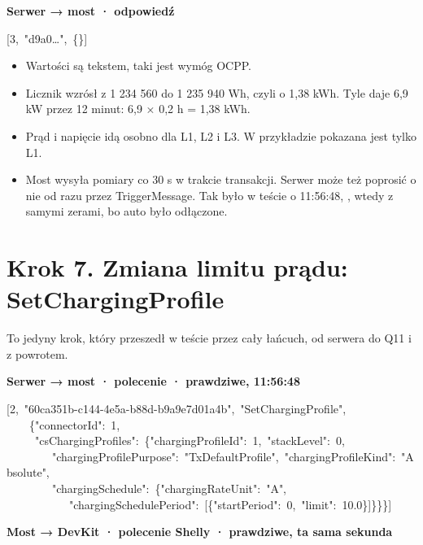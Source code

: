 \documentclass[11pt,a4paper]{article}
\begin{document}
\textbf{Serwer {\symbolfont→} most · odpowiedź}


\begin{kodbox}
\mbox{}[3,\ "d9a0…",\ \{\}]
\end{kodbox}

\begin{itemize}
\item Wartości są tekstem, taki jest wymóg OCPP.
\item Licznik wzrósł z 1 234 560 do 1 235 940 Wh, czyli o 1,38 kWh. Tyle daje 6,9 kW przez 12 minut: 6,9 × 0,2 h = 1,38 kWh.
\item Prąd i napięcie idą osobno dla L1, L2 i L3. W przykładzie pokazana jest tylko L1.
\item Most wysyła pomiary co 30 s w trakcie transakcji. Serwer może też poprosić o nie od razu przez TriggerMessage. Tak było w teście o 11:56:48, , wtedy z samymi zerami, bo auto było odłączone.
\end{itemize}

\section*{Krok 7. Zmiana limitu prądu: SetChargingProfile}

To jedyny krok, który przeszedł w teście przez cały łańcuch, od serwera do Q11 i z powrotem.


\textbf{Serwer {\symbolfont→} most · polecenie ·  prawdziwe, 11:56:48}


\begin{kodbox}
\mbox{}[2,\ "60ca351b-c144-4e5a-b88d-b9a9e7d01a4b",\ "SetChargingProfile",\\
\mbox{}\ \ \ \ \{"connectorId":\ 1,\\
\mbox{}\ \ \ \ \ "csChargingProfiles":\ \{"chargingProfileId":\ 1,\ "stackLevel":\ 0,\\
\mbox{}\ \ \ \ \ \ \ \ "chargingProfilePurpose":\ "TxDefaultProfile",\ "chargingProfileKind":\ "Absolute",\\
\mbox{}\ \ \ \ \ \ \ \ "chargingSchedule":\ \{"chargingRateUnit":\ "A",\\
\mbox{}\ \ \ \ \ \ \ \ \ \ \ "chargingSchedulePeriod":\ [\{"startPeriod":\ 0,\ "limit":\ 10.0\}]\}\}\}]
\end{kodbox}

\textbf{Most {\symbolfont→} DevKit · polecenie Shelly ·  prawdziwe, ta sama sekunda}
\end{document}
